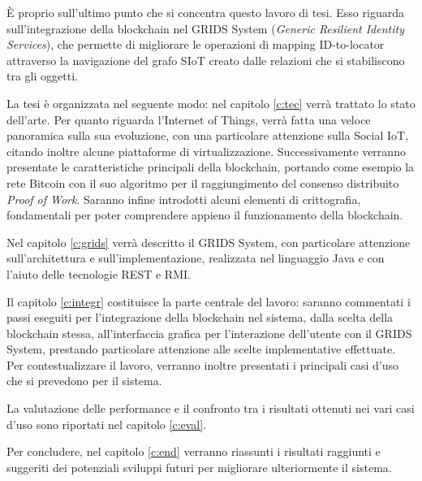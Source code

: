 \`E proprio sull'ultimo punto che si concentra questo lavoro di tesi. Esso riguarda sull'integrazione della blockchain nel GRIDS System (\textit{Generic Resilient Identity Services}), che permette di migliorare le operazioni di mapping ID-to-locator attraverso la navigazione del grafo SIoT creato dalle relazioni che si stabiliscono tra gli oggetti. 

La tesi è organizzata nel seguente modo: nel capitolo \ref{c:tec} verrà trattato lo stato dell'arte. Per quanto riguarda l'Internet of Things, verrà fatta una veloce panoramica sulla sua evoluzione, con una particolare attenzione sulla Social IoT, citando inoltre alcune piattaforme di virtualizzazione. 
Successivamente verranno presentate le caratteristiche principali della blockchain, portando come esempio la rete Bitcoin con il suo algoritmo per il raggiungimento del consenso distribuito \textit{Proof of Work}.
Saranno infine introdotti alcuni elementi di crittografia, fondamentali per poter comprendere appieno il funzionamento della blockchain.

Nel capitolo \ref{c:grids} verrà descritto il GRIDS System, con particolare attenzione sull'architettura e sull'implementazione, realizzata nel linguaggio Java e con l'aiuto delle tecnologie REST e RMI.

Il capitolo \ref{c:integr} costituisce la parte centrale del lavoro: saranno commentati i passi eseguiti per l'integrazione della blockchain nel sistema, dalla scelta della blockchain stessa, all'interfaccia grafica per l'interazione dell'utente con il GRIDS System, prestando particolare attenzione alle scelte implementative effettuate. Per contestualizzare il lavoro, verranno inoltre presentati i principali casi d'uso che si prevedono per il sistema.

La valutazione delle performance e il confronto tra i risultati ottenuti nei vari casi d'uso sono riportati nel capitolo \ref{c:eval}.

Per concludere, nel capitolo \ref{c:end} verranno riassunti i risultati raggiunti e suggeriti dei potenziali sviluppi futuri per migliorare ulteriormente il sistema.